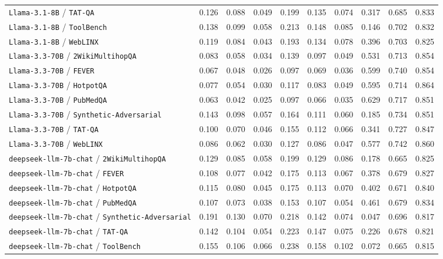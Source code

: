 \begin{longtable}{lccccccccc}
\texttt{Llama-3.1-8B} / \texttt{TAT-QA} & 0.126 & 0.088 & 0.049 & 0.199 & 0.135 & 0.074 & 0.317 & 0.685 & 0.833 \\
\texttt{Llama-3.1-8B} / \texttt{ToolBench} & 0.138 & 0.099 & 0.058 & 0.213 & 0.148 & 0.085 & 0.146 & 0.702 & 0.832 \\
\texttt{Llama-3.1-8B} / \texttt{WebLINX} & 0.119 & 0.084 & 0.043 & 0.193 & 0.134 & 0.078 & 0.396 & 0.703 & 0.825 \\
\texttt{Llama-3.3-70B} / \texttt{2WikiMultihopQA} & 0.083 & 0.058 & 0.034 & 0.139 & 0.097 & 0.049 & 0.531 & 0.713 & 0.854 \\
\texttt{Llama-3.3-70B} / \texttt{FEVER} & 0.067 & 0.048 & 0.026 & 0.097 & 0.069 & 0.036 & 0.599 & 0.740 & 0.854 \\
\texttt{Llama-3.3-70B} / \texttt{HotpotQA} & 0.077 & 0.054 & 0.030 & 0.117 & 0.083 & 0.049 & 0.595 & 0.714 & 0.864 \\
\texttt{Llama-3.3-70B} / \texttt{PubMedQA} & 0.063 & 0.042 & 0.025 & 0.097 & 0.066 & 0.035 & 0.629 & 0.717 & 0.851 \\
\texttt{Llama-3.3-70B} / \texttt{Synthetic-Adversarial} & 0.143 & 0.098 & 0.057 & 0.164 & 0.111 & 0.060 & 0.185 & 0.734 & 0.851 \\
\texttt{Llama-3.3-70B} / \texttt{TAT-QA} & 0.100 & 0.070 & 0.046 & 0.155 & 0.112 & 0.066 & 0.341 & 0.727 & 0.847 \\
\texttt{Llama-3.3-70B} / \texttt{WebLINX} & 0.086 & 0.062 & 0.030 & 0.127 & 0.086 & 0.047 & 0.577 & 0.742 & 0.860 \\
\texttt{deepseek-llm-7b-chat} / \texttt{2WikiMultihopQA} & 0.129 & 0.085 & 0.058 & 0.199 & 0.129 & 0.086 & 0.178 & 0.665 & 0.825 \\
\texttt{deepseek-llm-7b-chat} / \texttt{FEVER} & 0.108 & 0.077 & 0.042 & 0.175 & 0.113 & 0.067 & 0.378 & 0.679 & 0.827 \\
\texttt{deepseek-llm-7b-chat} / \texttt{HotpotQA} & 0.115 & 0.080 & 0.045 & 0.175 & 0.113 & 0.070 & 0.402 & 0.671 & 0.840 \\
\texttt{deepseek-llm-7b-chat} / \texttt{PubMedQA} & 0.107 & 0.073 & 0.038 & 0.153 & 0.107 & 0.054 & 0.461 & 0.679 & 0.834 \\
\texttt{deepseek-llm-7b-chat} / \texttt{Synthetic-Adversarial} & 0.191 & 0.130 & 0.070 & 0.218 & 0.142 & 0.074 & 0.047 & 0.696 & 0.817 \\
\texttt{deepseek-llm-7b-chat} / \texttt{TAT-QA} & 0.142 & 0.104 & 0.054 & 0.223 & 0.147 & 0.075 & 0.226 & 0.678 & 0.821 \\
\texttt{deepseek-llm-7b-chat} / \texttt{ToolBench} & 0.155 & 0.106 & 0.066 & 0.238 & 0.158 & 0.102 & 0.072 & 0.665 & 0.815 \\

\end{longtable}
